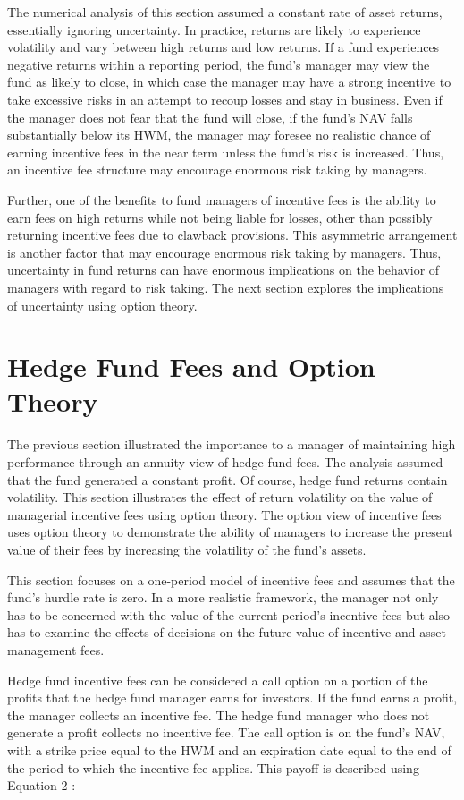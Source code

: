 \documentclass[11pt]{article}
\begin{document}
The numerical analysis of this section assumed a constant rate of asset returns, essentially ignoring uncertainty. In practice, returns are likely to experience volatility and vary between high returns and low returns. If a fund experiences negative returns within a reporting period, the fund's manager may view the fund as likely to close, in which case the manager may have a strong incentive to take excessive risks in an attempt to recoup losses and stay in business. Even if the manager does not fear that the fund will close, if the fund's NAV falls substantially below its HWM, the manager may foresee no realistic chance of earning incentive fees in the near term unless the fund's risk is increased. Thus, an incentive fee structure may encourage enormous risk taking by managers.

Further, one of the benefits to fund managers of incentive fees is the ability to earn fees on high returns while not being liable for losses, other than possibly returning incentive fees due to clawback provisions. This asymmetric arrangement is another factor that may encourage enormous risk taking by managers. Thus, uncertainty in fund returns can have enormous implications on the behavior of managers with regard to risk taking. The next section explores the implications of uncertainty using option theory.

\section*{Hedge Fund Fees and Option Theory}
The previous section illustrated the importance to a manager of maintaining high performance through an annuity view of hedge fund fees. The analysis assumed that the fund generated a constant profit. Of course, hedge fund returns contain volatility. This section illustrates the effect of return volatility on the value of managerial incentive fees using option theory. The option view of incentive fees uses option theory to demonstrate the ability of managers to increase the present value of their fees by increasing the volatility of the fund's assets.

This section focuses on a one-period model of incentive fees and assumes that the fund's hurdle rate is zero. In a more realistic framework, the manager not only has to be concerned with the value of the current period's incentive fees but also has to examine the effects of decisions on the future value of incentive and asset management fees.

Hedge fund incentive fees can be considered a call option on a portion of the profits that the hedge fund manager earns for investors. If the fund earns a profit, the manager collects an incentive fee. The hedge fund manager who does not generate a profit collects no incentive fee. The call option is on the fund's NAV, with a strike price equal to the HWM and an expiration date equal to the end of the period to which the incentive fee applies. This payoff is described using Equation 2 :
\end{document}
